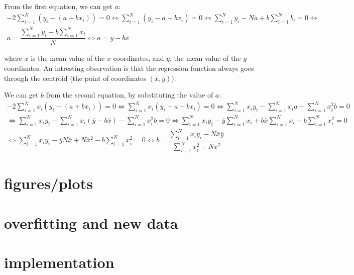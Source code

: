 \documentclass[notitlepage, 11pt]{report}
\begin{document}
		From the first equation, we can get $a$:
		\begin{multline*}
			-2\sum_{i=1}^{N}(y_i - (a+bx_i)) = 0 \Leftrightarrow \sum_{i=1}^{N}(y_i -a - bx_i) = 0 \Leftrightarrow \sum_{i=1}^{N}y_i - Na + b \sum_{i=1}^{N}b_i = 0 \Leftrightarrow \\
			 a = \dfrac{\sum_{i=1}^{N}y_i - b \sum_{i=1}^{N}x_i }{N} \Leftrightarrow a = \overline{y} - b \overline{x} 
		\end{multline*}
		
		where $\overline{x}$ is the mean value of the $x$ coordinates, and $\overline{y}$, the mean value of the $y$ coordinates. An intresting observation is that the regression function always goes through the centroid (the point of coordinates $(\overline{x}, \overline{y})$).
		
		We can get $b$ from the second equation, by substituting the value of $a$:		
		\begin{multline*}
			-2\sum_{i=1}^{N} x_i(y_i - (a+bx_i)) = 0 \Leftrightarrow 		\sum_{i=1}^{N}x_i(y_i -a - bx_i) = 0 \Leftrightarrow \sum_{i=1}^{N}x_iy_i - \sum_{i=1}^{N} x_ia - \sum_{i=1}^{N} x_i^2b = 0 \\
			\Leftrightarrow \sum_{i=1}^{N} x_iy_i - \sum_{i=1}^{N}x_i(\overline{y} - b\overline{x}) - \sum_{i=1}^{N} x_i^2b = 0 \Leftrightarrow \sum_{i=1}^{N}x_iy_i - \overline{y}\sum_{i=1}^{N}x_i + b\overline{x}\sum_{i=1}^{N}x_i - b\sum_{i=1}^{N} x_i^2 = 0 \\
			\Leftrightarrow \sum_{i=1}^{N} x_iy_i - \overline{y}N\overline{x} + N\overline{x}^2 - b\sum_{i=1}^{N}x_i^2 = 0 \Leftrightarrow b = \dfrac{\sum_{i=1}^{N}x_iy_i - N \overline{x}\overline{y}}{\sum_{i-1}^{N}x_i^2 - N\overline{x}^2}
 		\end{multline*}
 		
 		
			
					
		\section{figures/plots}
		
		\section{overfitting and new data}
				
		\section{implementation}
		
	
\end{document}
